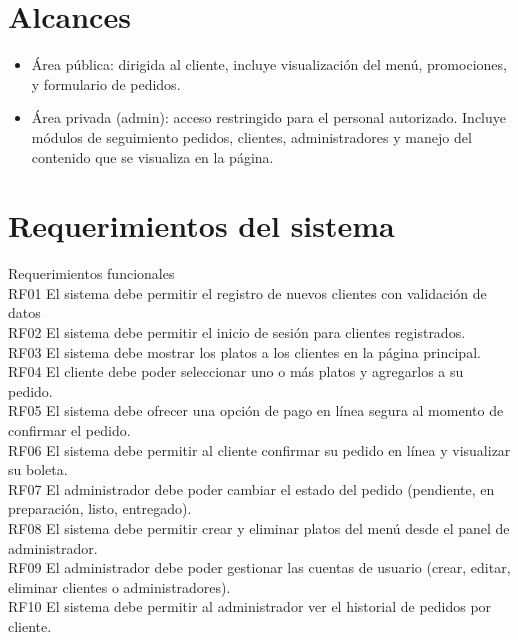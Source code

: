 \documentclass{article}
\begin{document}
\begin{doublespace}
    \section{Alcances}
    \begin{itemize}
        \item Área pública: dirigida al cliente, incluye visualización del menú, promociones, y formulario de pedidos.
        \item Área privada (admin): acceso restringido para el personal autorizado. Incluye módulos de seguimiento pedidos, clientes, administradores y manejo del contenido que se visualiza en la página.
    \end{itemize}

    \section{Requerimientos del sistema}
    \noindent Requerimientos funcionales\\
        RF01	El sistema debe permitir el registro de nuevos clientes con validación de datos\\
        RF02	El sistema debe permitir el inicio de sesión para clientes registrados.\\
        RF03	El sistema debe mostrar los platos a los clientes en la página principal.\\
        RF04	El cliente debe poder seleccionar uno o más platos y agregarlos a su pedido.\\
        RF05	El sistema debe ofrecer una opción de pago en línea segura al momento de confirmar el pedido.\\
        RF06	El sistema debe permitir al cliente confirmar su pedido en línea y visualizar su boleta.\\
        RF07	El administrador debe poder cambiar el estado del pedido (pendiente, en preparación, listo, entregado).\\
        RF08	El sistema debe permitir crear y eliminar platos del menú desde el panel de administrador.\\
        RF09	El administrador debe poder gestionar las cuentas de usuario (crear, editar, eliminar clientes o administradores).\\
        RF10	El sistema debe permitir al administrador ver el historial de pedidos por cliente.\\


\end{doublespace}
\end{document}
